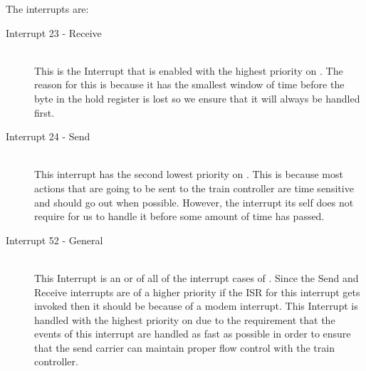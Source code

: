 \documentclass[pdftex,10pt,a4paper]{article}
\begin{document}
The interrupts are:
\begin{description}
\item[Interrupt 23 -  Receive] \hfill \\
	This is the Interrupt that is enabled with the highest priority on
	. The reason for this is because it has the smallest window
	of time before the byte in the hold register is lost so we ensure that
	it will always be handled first.
\item[Interrupt 24 -  Send] \hfill \\
	This interrupt has the second lowest priority on . This is
	because most actions that are going to be sent to the train controller
	are time sensitive and should go out when possible. However, the
	interrupt its self does not require for us to handle it before some
	amount of time has passed.
\item[Interrupt 52 -  General] \hfill \\
	This Interrupt is an or of all of the interrupt cases of .
	Since the  Send and Receive interrupts are of a higher
	priority if the ISR for this interrupt gets invoked then it should be
	because of a modem interrupt. This Interrupt is handled with the
	highest priority on  due to the requirement that the events
	of this interrupt are handled as fast as possible in order to ensure
	that the  send carrier can maintain proper flow control
	with the train controller.
\end{description}
\end{document}
